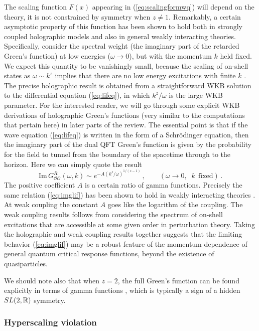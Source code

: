 \documentclass[10pt, oneside]{book}
\def\be{\begin{equation}}
\def\ee{\end{equation}}
\def\R{{{\Bbb R}}}
\def\ocal{{\mathcal{O}}}
\begin{document}
\begin{doublespace}
The scaling function $F(x)$ appearing in (\ref{eq:scalingformwq}) will depend on the theory, it is not constrained by symmetry when $z \neq 1$. Remarkably, a certain asymptotic property of this function has been shown to hold both in strongly coupled holographic models and also in general weakly interacting theories. Specifically, consider the spectral weight (the imaginary part of the retarded Green's function) at low energies ($\omega \to 0$), but with the momentum $k$ held fixed. We expect this quantity to be vanishingly small, because the scaling of on-shell states as $\omega \sim k^z$ implies that there are no low energy excitations with finite $k$ \cite{Hartnoll:2012rj, Hartnoll:2012wm}. The precise holographic result is obtained from a straightforward WKB solution to the differential equation (\ref{eq:lifeq}), in which $k^z/\omega$ is the large WKB parameter. For the interested reader, we will go through some explicit WKB derivations of holographic Green's functions (very similar to the computations that pertain here) in later parts of the review. The essential point is that if the wave equation (\ref{eq:lifeq}) is written in the form of a Schr\"odinger equation, then the imaginary part of the dual QFT Green's function is given by the probability for the field to tunnel from the boundary of the spacetime through to the horizon. Here we can simply quote the result \cite{Keeler:2015afa}
\be
\text{Im} \, G^R_{\ocal\ocal}(\omega,k) \sim e^{ - A \left(k^{z}/\omega \right)^{1/(z-1)}} \,, \qquad (\omega \to 0, \;\; k \;\, \text{fixed}) \,. \label{eq:imglif}
\ee
The positive coefficient $A$ is a certain ratio of gamma functions. Precisely the same relation (\ref{eq:imglif}) has been shown to hold in weakly interacting theories \cite{Keeler:2015afa}. At weak coupling the constant $A$ goes like the logarithm of the coupling. The weak coupling results follows from considering the spectrum of on-shell excitations that are accessible at some given order in perturbation theory. Taking the holographic and weak coupling results together suggests that the limiting behavior (\ref{eq:imglif}) may be a robust feature of the momentum dependence of general quantum critical response functions, beyond the existence of quasiparticles.

We should note also that when $z=2$, the full Green's function can be found explicitly in terms of gamma functions \cite{Kachru:2008yh,Taylor:2008tg}, which is typically a sign of a hidden $SL(2,\R)$ symmetry.

\subsubsection{Hyperscaling violation}


\end{doublespace}
\end{document}
